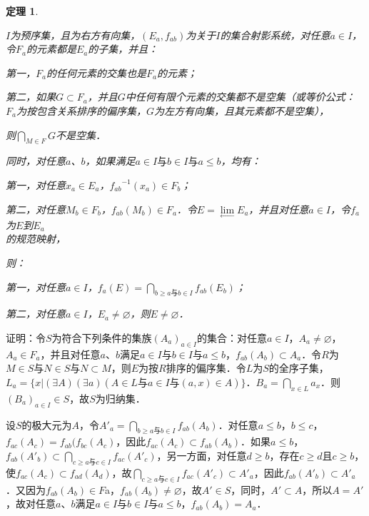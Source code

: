 \documentclass[12pt, a4paper, oneside]{book}
\newtheorem{theo}{定理}
\begin{document}
			\begin{theo}\label{theo182}
				\hfill\par
				$I$为预序集，且为右方有向集，$(E_a, f_{ab})$为关于$I$的集合射影系统，对任意$a\in I$，令$F_a$的元素都是$E_a$的子集，并且：
				\par
				第一，$F_a$的任何元素的交集也是$F_a$的元素；
				\par
				第二，如果$G\subset F_a$，并且$G$中任何有限个元素的交集都不是空集（或等价公式：$F_a$为按包含关系排序的偏序集，$G$为左方有向集，且其元素都不是空集），
				\par
				则$\bigcap\limits_{M\in F}G$不是空集．
				\par
				同时，对任意$a$、$b$，如果满足$a\in I\text{与}b\in I\text{与}a\leq b$，均有：
				\par
				第一，对任意$x_a\in E_a$，${f_{ab}}^{-1}(x_a)\in F_b$；
				\par
				第二，对任意$M_b\in F_b$，$f_{ab}(M_b)\in F_a$．令$E=\lim\limits_\gets E_a$，并且对任意$a\in I$，令$f_a$为$E$到$E_a$\\的规范映射，
				\par
				则：
				\par
				第一，对任意$a\in I$，$f_a(E)=\bigcap\limits_{b\geq a\text{与}b\in I}f_{ab}(E_b)$；
				\par
				第二，对任意$a\in I$，$E_a\neq \varnothing$，则$E\neq \varnothing$．
			\end{theo}
			证明：令$S$为符合下列条件的集族$(A_a)_{a\in I}$的集合：对任意$a\in I$，$A_a\neq \varnothing$，$A_a\in F_a$，并且对任意$a$、$b$满足$a\in I\text{与}b\in I\text{与}a\leq b$，$f_{ab}(A_b)\subset A_a$．令$R$为$M\in S\text{与}N\in S\text{与}N\subset M$，则$E$为按$R$排序的偏序集．令$L$为$S$的全序子集，$L_a=\{x|(\exists A)(\exists a)(A\in L\text{与}a\in I\text{与}(a, x)\in A)\}$．$B_a=\bigcap\limits_{x\in L}a_x$．则$(B_a)_{a\in I}\in S$，故$S$为归纳集．
			\par
			设$S$的极大元为$A$，令${A'}_a=\bigcap\limits_{b\geq a\text{与}b\in I}f_{ab}(A_b)$．对任意$a\leq b$，$b\leq c$，$f_{ac}(A_c)=f_{ab}(f_{bc}(A_c)$，因此$f_{ac}(A_c)\subset f_{ab}(A_b)$．如果$a\leq b$，$f_{ab}({A'}_b)\subset \bigcap\limits_{c\geq a\text{与}c\in I}f_{ac}({A'}_c)$，另一方面，对任意$d\geq b$，存在$c\geq d$且$c\geq b$，使$f_{ac}(A_c)\subset f_{ad}(A_d)$，故$\bigcap\limits_{c\geq a\text{与}c\in I}f_{ac}({A'}_c)\subset {A'}_a$，因此$f_{ab}({A'}_b)\subset {A'}_a$．又因为$f_{ab}(A_b)\in F$a，$f_{ab}(A_b)\neq \varnothing$，故$A'\in S$，同时，$A'\subset A$，所以$A=A'$，故对任意$a$、$b$满足$a\in I\text{与}b\in I\text{与}a\leq b$，$f_{ab}(A_b)=A_a$．
\end{document}
